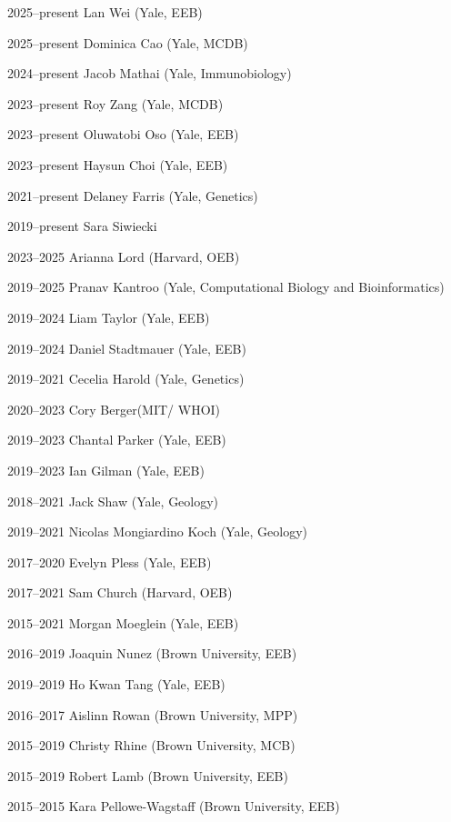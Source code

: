 \begin{entry}{60pt}
\item [\rm 2025--present] Lan Wei (Yale, EEB)
\item [\rm 2025--present] Dominica Cao (Yale, MCDB)
\item [\rm 2024--present] Jacob Mathai (Yale, Immunobiology)
\item [\rm 2023--present] Roy Zang (Yale, MCDB)
\item [\rm 2023--present] Oluwatobi Oso (Yale, EEB)
\item [\rm 2023--present] Haysun Choi (Yale, EEB)
\item [\rm 2021--present] Delaney Farris (Yale, Genetics)
\item [\rm 2019--present] Sara Siwiecki
\item [\rm 2023--2025] Arianna Lord (Harvard, OEB)
\item [\rm 2019--2025] Pranav Kantroo (Yale, Computational Biology and Bioinformatics)
\item [\rm 2019--2024] Liam Taylor (Yale, EEB)
\item [\rm 2019--2024] Daniel Stadtmauer (Yale, EEB)
\item [\rm 2019--2021] Cecelia Harold (Yale, Genetics)
\item [\rm 2020--2023] Cory Berger(MIT/ WHOI)
\item [\rm 2019--2023] Chantal Parker (Yale, EEB)
\item [\rm 2019--2023] Ian Gilman (Yale, EEB)
\item [\rm 2018--2021] Jack Shaw (Yale, Geology)
\item [\rm 2019--2021] Nicolas Mongiardino Koch (Yale, Geology)
\item [\rm 2017--2020] Evelyn Pless (Yale, EEB)
\item [\rm 2017--2021] Sam Church (Harvard, OEB)
\item [\rm 2015--2021] Morgan Moeglein (Yale, EEB)
\item [\rm 2016--2019] Joaquin Nunez (Brown University, EEB)
\item [\rm 2019--2019] Ho Kwan Tang (Yale, EEB)
\item [\rm 2016--2017] Aislinn Rowan (Brown University, MPP)
\item [\rm 2015--2019] Christy Rhine (Brown University, MCB)
\item [\rm 2015--2019] Robert Lamb (Brown University, EEB)
\item [\rm 2015--2015] Kara Pellowe-Wagstaff (Brown University, EEB)

\end{entry}
